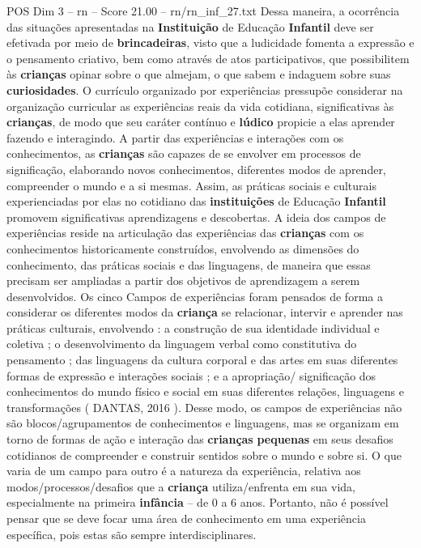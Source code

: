 \begin{textsample}{POS Dim 3 – rn – Score 21.00 – rn/rn\_inf\_27.txt}
Dessa maneira, a ocorrência das situações apresentadas na \textbf{Instituição} de Educação \textbf{Infantil} deve ser efetivada por meio de \textbf{brincadeiras}, visto que a ludicidade fomenta a expressão e o pensamento criativo, bem como através de atos participativos, que possibilitem às \textbf{crianças} opinar sobre o que almejam, o que sabem e indaguem sobre suas \textbf{curiosidades}.
O currículo organizado por experiências pressupõe considerar na organização curricular as experiências reais da vida cotidiana, significativas às \textbf{crianças}, de modo que seu caráter contínuo e \textbf{lúdico} propicie a elas aprender fazendo e interagindo.
A partir das experiências e interações com os conhecimentos, as \textbf{crianças} são capazes de se envolver em processos de significação, elaborando novos conhecimentos, diferentes modos de aprender, compreender o mundo e a si mesmas.
Assim, as práticas sociais e culturais experienciadas por elas no cotidiano das \textbf{instituições} de Educação \textbf{Infantil} promovem significativas aprendizagens e descobertas.
A ideia dos campos de experiências reside na articulação das experiências das \textbf{crianças} com os conhecimentos historicamente construídos, envolvendo as dimensões do conhecimento, das práticas sociais e das linguagens, de maneira que essas precisam ser ampliadas a partir dos objetivos de aprendizagem a serem desenvolvidos.
Os cinco Campos de experiências foram pensados de forma a considerar os diferentes modos da \textbf{criança} se relacionar, intervir e aprender nas práticas culturais, envolvendo : a construção de sua identidade individual e coletiva ; o desenvolvimento da linguagem verbal como constitutiva do pensamento ; das linguagens da cultura corporal e das artes em suas diferentes formas de expressão e interações sociais ; e a apropriação/ significação dos conhecimentos do mundo físico e social em suas diferentes relações, linguagens e transformações ( DANTAS, 2016 ).
Desse modo, os campos de experiências não são blocos/agrupamentos de conhecimentos e linguagens, mas se organizam em torno de formas de ação e interação das \textbf{crianças} \textbf{pequenas} em seus desafios cotidianos de compreender e construir sentidos sobre o mundo e sobre si.
O que varia de um campo para outro é a natureza da experiência, relativa aos modos/processos/desafios que a \textbf{criança} utiliza/enfrenta em sua vida, especialmente na primeira \textbf{infância} – de 0 a 6 anos.
Portanto, não é possível pensar que se deve focar uma área de conhecimento em uma experiência específica, pois estas são sempre interdisciplinares.

\end{textsample}
